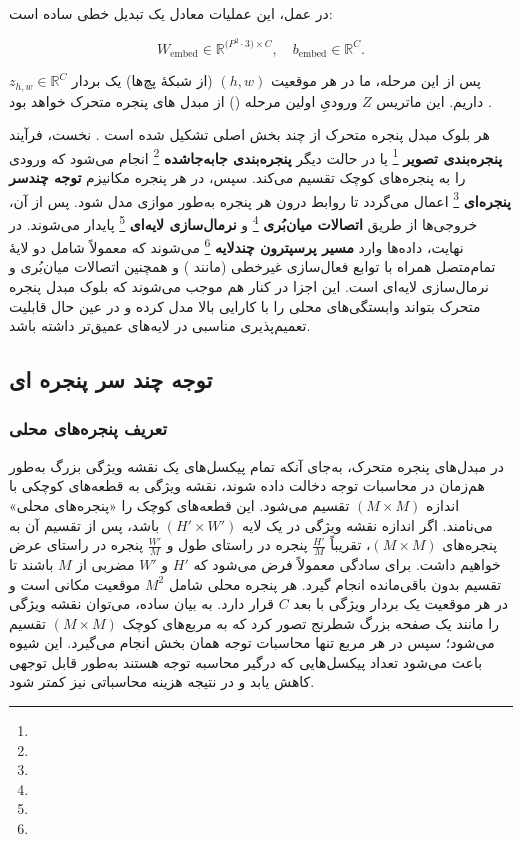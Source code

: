 در عمل، این عملیات معادل یک تبدیل خطی ساده است:

\[
W_{\text{embed}} \in \mathbb{R}^{\bigl(P^2 \cdot 3\bigr) \times C},
\quad
b_{\text{embed}} \in \mathbb{R}^{C}.
\]

پس از این مرحله، ما در هر موقعیت \((h, w)\) (از شبکهٔ پچ‌ها) یک بردار 
\(\displaystyle z_{h,w} \in \mathbb{R}^{C}\) داریم. این ماتریس \(\displaystyle Z\) 
ورودیِ اولین مرحله () از مبدل های پنجره متحرک خواهد بود \cite{liu2021swintransformer}.

هر بلوک مبدل پنجره متحرک از چند بخش اصلی تشکیل شده است \cite{liu2021swintransformer}. 
نخست، فرآیند \textbf{پنجره‌بندی تصویر} \footnote{} یا در حالت دیگر \textbf{پنجره‌بندی جابه‌جاشده} \footnote{} انجام می‌شود که ورودی را به پنجره‌های کوچک تقسیم می‌کند. سپس، در هر پنجره مکانیزم \textbf{توجه چندسر پنجره‌ای} \footnote{} اعمال می‌گردد تا روابط درون هر پنجره به‌طور موازی مدل شود. پس از آن، خروجی‌ها از طریق \textbf{اتصالات میان‌بُری} \footnote{} و \textbf{نرمال‌سازی لایه‌ای} \footnote{} پایدار می‌شوند. در نهایت، داده‌ها وارد \textbf{مسیر پرسپترون چندلایه} \footnote{} می‌شوند که معمولاً شامل دو لایهٔ تمام‌متصل همراه با توابع فعال‌سازی غیرخطی (مانند ) و همچنین اتصالات میان‌بُری و نرمال‌سازی لایه‌ای است. این اجزا در کنار هم موجب می‌شوند که بلوک مبدل پنجره متحرک بتواند وابستگی‌های محلی را با کارایی بالا مدل کرده و در عین حال قابلیت تعمیم‌پذیری مناسبی در لایه‌های عمیق‌تر داشته باشد.



\subsection{توجه چند سر پنجره ای}

\subsubsection{تعریف پنجره‌های محلی}
در مبدل‌های پنجره متحرک، به‌جای آنکه تمام پیکسل‌های یک نقشه ویژگی بزرگ به‌طور هم‌زمان در محاسبات توجه دخالت داده شوند، نقشه ویژگی به قطعه‌های کوچکی با اندازه \((M \times M)\) تقسیم می‌شود. این قطعه‌های کوچک را «پنجره‌های محلی» می‌نامند. اگر اندازه نقشه ویژگی در یک لایه \((H' \times W')\) باشد، پس از تقسیم آن به پنجره‌های \((M \times M)\)، تقریباً \(\tfrac{H'}{M}\) پنجره در راستای طول و \(\tfrac{W'}{M}\) پنجره در راستای عرض خواهیم داشت. برای سادگی معمولاً فرض می‌شود که \(H'\) و \(W'\) مضربی از \(M\) باشند تا تقسیم بدون باقی‌مانده انجام گیرد. هر پنجره محلی شامل \(M^2\) موقعیت مکانی است و در هر موقعیت یک بردار ویژگی با بعد \(C\) قرار دارد. به بیان ساده، می‌توان نقشه ویژگی را مانند یک صفحه بزرگ شطرنج تصور کرد که به مربع‌های کوچک \((M \times M)\) تقسیم می‌شود؛ سپس در هر مربع تنها محاسبات توجه همان بخش انجام می‌گیرد. این شیوه باعث می‌شود تعداد پیکسل‌هایی که درگیر محاسبه توجه هستند به‌طور قابل توجهی کاهش یابد و در نتیجه هزینه محاسباتی نیز کمتر شود.

